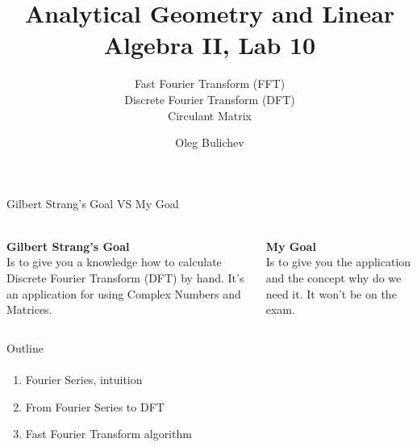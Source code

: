 \documentclass[aspectratio=169]{beamer}
\title[AGLA2]{Analytical Geometry and Linear Algebra II, Lab 10} %
\subtitle{Fast Fourier Transform (FFT) \\ Discrete Fourier Transform (DFT) \\ Circulant Matrix
         } %
\author{Oleg Bulichev}
\newcommand{\fbckg}[1]{\usebackgroundtemplate{\texttt{[image: \#1]}}}%
\begin{document}
\setlength{\abovedisplayskip}{0pt}
\setlength{\belowdisplayskip}{0pt}
\setlength{\abovedisplayshortskip}{0pt}
\setlength{\belowdisplayshortskip}{0pt}

\fbckg{fibeamer/figs/title_page.png}

\fbckg{fibeamer/figs/common.png}


\begin{frame}[t]{Gilbert Strang's Goal VS My Goal}
\framesubtitle{}
\Large
    \begin{columns}[T,onlytextwidth]
        \begin{column}{0.49\textwidth}
            \textbf{Gilbert Strang's Goal} \\
            Is to give you a knowledge how to calculate Discrete Fourier Transform (DFT) by hand. It's an application for using Complex Numbers and Matrices.
        \end{column}
        \begin{column}{0.49\textwidth}
            \textbf{My Goal} \\ 
            Is to give you the application and the concept why do we need it. It won't be on the exam.
        \end{column}
    \end{columns}
\end{frame}


\begin{frame}[t]{Outline}
\framesubtitle{}
    \Large
    \begin{enumerate}
        \item Fourier Series, intuition
        \item From Fourier Series to DFT
        \item Fast Fourier Transform algorithm
    \end{enumerate}
\end{frame}
\end{document}
